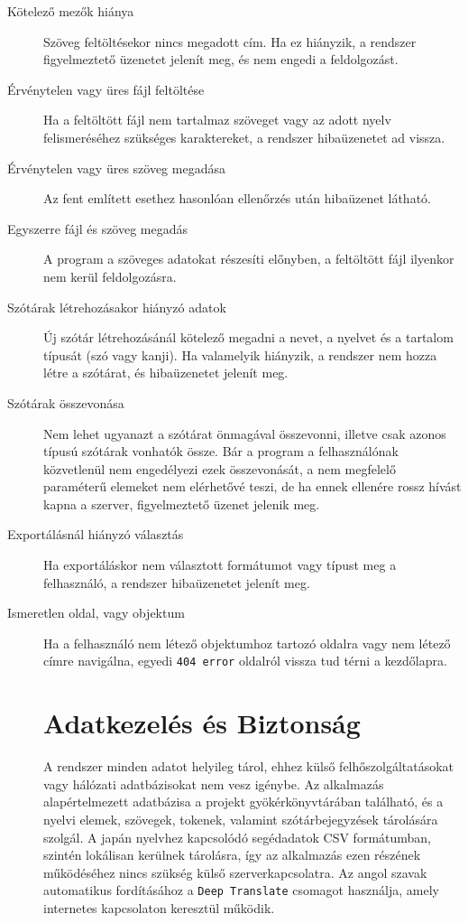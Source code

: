 \begin{description}
	\item[Kötelező mezők hiánya] Szöveg feltöltésekor nincs megadott cím. Ha ez hiányzik, a rendszer figyelmeztető üzenetet jelenít meg, és nem engedi a feldolgozást.
	\item[Érvénytelen vagy üres fájl feltöltése] Ha a feltöltött fájl nem tartalmaz szöveget vagy az adott nyelv felismeréséhez szükséges karaktereket, a rendszer hibaüzenetet ad vissza.
    \item[Érvénytelen vagy üres szöveg megadása] Az fent említett esethez hasonlóan ellenőrzés után hibaüzenet látható.
    \item[Egyszerre fájl és szöveg megadás] A program a szöveges adatokat részesíti előnyben, a feltöltött fájl ilyenkor nem kerül feldolgozásra.
	\item[Szótárak létrehozásakor hiányzó adatok] Új szótár létrehozásánál kötelező megadni a nevet, a nyelvet és a tartalom típusát (szó vagy kanji). Ha valamelyik hiányzik, a rendszer nem hozza létre a szótárat, és hibaüzenetet jelenít meg.
    \item[Szótárak összevonása] Nem lehet ugyanazt a szótárat önmagával összevonni, illetve csak azonos típusú szótárak vonhatók össze. Bár a program a felhasználónak közvetlenül nem engedélyezi ezek összevonását, a nem megfelelő paraméterű elemeket nem elérhetővé teszi, de ha ennek ellenére rossz hívást kapna a szerver, figyelmeztető üzenet jelenik meg.
    \item[Exportálásnál hiányzó választás] Ha exportáláskor nem választott formátumot vagy típust meg a felhasználó, a rendszer hibaüzenetet jelenít meg.
    \item[Ismeretlen oldal, vagy objektum] Ha a felhasználó nem létező objektumhoz tartozó oldalra vagy nem létező címre navigálna, egyedi \texttt{404 error} oldalról vissza tud térni a kezdőlapra.

\section{Adatkezelés és Biztonság}

A rendszer minden adatot helyileg tárol, ehhez külső felhőszolgáltatásokat vagy hálózati adatbázisokat nem vesz igénybe. Az alkalmazás alapértelmezett adatbázisa a projekt gyökérkönyvtárában található, és a nyelvi elemek, szövegek, tokenek, valamint szótárbejegyzések tárolására szolgál. A japán nyelvhez kapcsolódó segédadatok CSV formátumban, szintén lokálisan kerülnek tárolásra, így az alkalmazás ezen részének működéséhez nincs szükség külső szerverkapcsolatra. Az angol szavak automatikus fordításához a \texttt{Deep Translate} csomagot használja, amely internetes kapcsolaton keresztül működik.


\end{description}
